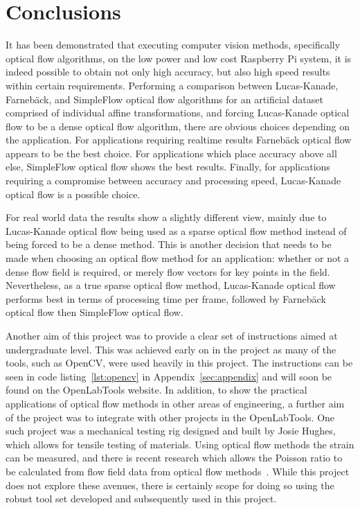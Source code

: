 \chapter{Conclusions}
\label{sec:conclusions}

\ifpdf
    \graphicspath{{Section5/Figs/Raster/}{Section5/Figs/PDF/}{Section5/Figs/}}
\else
    \graphicspath{{Section5/Figs/Vector/}{Section5/Figs/}}
\fi

It has been demonstrated that executing computer vision methods, specifically optical flow algorithms, on the low power and low cost Raspberry Pi system, it is indeed possible to obtain not only high accuracy, but also high speed results within certain requirements. Performing a comparison between Lucas-Kanade, Farnebäck, and SimpleFlow optical flow algorithms for an artificial dataset comprised of individual affine transformations, and forcing Lucas-Kanade optical flow to be a dense optical flow algorithm, there are obvious choices depending on the application. For applications requiring realtime results Farnebäck optical flow appears to be the best choice. For applications which place accuracy above all else, SimpleFlow optical flow shows the best results. Finally, for applications requiring a compromise between accuracy and processing speed, Lucas-Kanade optical flow is a possible choice.

For real world data the results show a slightly different view, mainly due to Lucas-Kanade optical flow being used as a sparse optical flow method instead of being forced to be a dense method. This is another decision that needs to be made when choosing an optical flow method for an application: whether or not a dense flow field is required, or merely flow vectors for key points in the field. Nevertheless, as a true sparse optical flow method, Lucas-Kanade optical flow performs best in terms of processing time per frame, followed by Farnebäck optical flow then SimpleFlow optical flow.

Another aim of this project was to provide a clear set of instructions aimed at undergraduate level. This was achieved early on in the project as many of the tools, such as OpenCV, were used heavily in this project. The instructions can be seen in code listing~\ref{lst:opencv} in Appendix~\ref{sec:appendix} and will soon be found on the OpenLabTools website. In addition, to show the practical applications of optical flow methods in other areas of engineering, a further aim of the project was to integrate with other projects in the OpenLabTools. One such project was a mechanical testing rig designed and built by Josie Hughes, which allows for tensile testing of materials. Using optical flow methods the strain can be measured, and there is recent research which allows the Poisson ratio to be calculated from flow field data from optical flow methods~\cite{chen2013new}. While this project does not explore these avenues, there is certainly scope for doing so using the robust tool set developed and subsequently used in this project.

